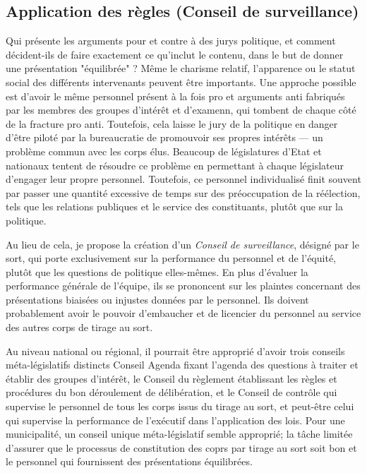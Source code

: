 \subsection{Application des règles (Conseil de surveillance)}
Qui présente les arguments pour et contre à des jurys politique, et
comment décident-ils de faire exactement ce qu'inclut le contenu, dans
le but de donner une présentation "équilibrée" ? Même le charisme
relatif, l'apparence ou le statut social des différents intervenants
peuvent être importants. Une approche possible est d'avoir le même
personnel présent à la fois pro et arguments anti fabriqués par les
membres des groupes d'intérêt et d'examenn, qui tombent de chaque côté
de la fracture pro anti. Toutefois, cela laisse le jury de la
politique en danger d'être piloté par la bureaucratie de promouvoir
ses propres intérêts --- un problème commun avec les corps élus. 
Beaucoup de législatures d'Etat et nationaux tentent de résoudre
ce problème en permettant à chaque législateur d'engager leur propre
personnel. Toutefois, ce personnel individualisé finit souvent par
passer une quantité excessive de temps sur des préoccupation de la
réélection, tels que les relations publiques et le service des
constituants, plutôt que sur la politique.\par
Au lieu de cela, je propose la création d'un \emph{Conseil de
  surveillance}, désigné par le sort, qui porte exclusivement sur la
performance du personnel et de l'équité, plutôt que les questions de
politique elles-mêmes. En plus d'évaluer la performance générale de
l'équipe, ils se prononcent sur les plaintes concernant des présentations
biaisées ou injustes données par le personnel. Ils doivent
probablement avoir le pouvoir d'embaucher et de licencier du personnel
au service des autres corps de tirage au sort.\par
Au niveau national ou régional, il pourrait être approprié d'avoir
trois conseils méta-législatifs distincts Conseil Agenda fixant
l'agenda des questions à traiter et établir des groupes
d'intérêt, le Conseil du règlement établissant les règles et
procédures du bon déroulement de délibération, et le Conseil de
contrôle qui supervise le personnel de tous les corps issus du
tirage au sort, et peut-être celui qui supervise la performance de
l'exécutif dans l'application des lois. Pour une municipalité, un
conseil unique méta-législatif semble approprié; la tâche limitée
d'assurer que le processus de constitution des coprs par tirage
au sort soit bon et le personnel qui fournissent des présentations
équilibrées.\par









  















